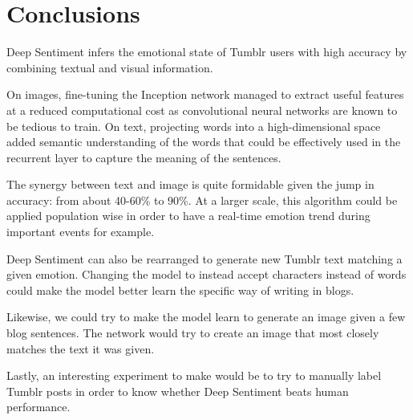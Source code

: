 \chapter{Conclusions}

Deep Sentiment infers the emotional state of Tumblr users with high accuracy by combining textual and visual information.

On images, fine-tuning the Inception network managed to extract useful features at a reduced computational cost as convolutional neural networks are known to be tedious to train. On text, projecting words into a high-dimensional space added semantic understanding of the words that could be effectively used in the recurrent layer to capture the meaning of the sentences. 

The synergy between text and image is quite formidable given the jump in accuracy: from about 40-60\% to 90\%. At a larger scale, this algorithm could be applied population wise in order to have a real-time emotion trend during important events for example.

Deep Sentiment can also be rearranged to generate new Tumblr text matching a given emotion. Changing the model to instead accept characters instead of words could make the model better learn the specific way of writing in blogs.

Likewise, we could try to make the model learn to generate an image given a few blog sentences. The network would try to create an image that most closely matches the text it was given.

Lastly, an interesting experiment to make would be to try to manually label Tumblr posts in order to know whether Deep Sentiment beats human performance.


